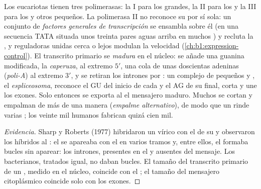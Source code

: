 \begin{proposition}\label{prop:b1:gene-expression:processing}
Los eucariotas tienen tres polimerasas: la I para los 
grandes, la II para los  y la III para los  y otros  pequeños. La polimerasa II no reconoce su 
por sí sola: un conjunto de \emph{factores generales de transcripción} se
ensambla sobre él (en una secuencia TATA situada unos treinta pares aguas
arriba en muchos ) y recluta la , y  reguladoras unidas
cerca o lejos modulan la velocidad (\cref{ch:b1:expression-control}). El
transcrito primario se \emph{madura} en el núcleo: se añade una guanina
modificada, la \emph{caperuza}, al extremo $5'$, una cola de unas doscientas
adeninas (\emph{poli-A}) al extremo $3'$, y se retiran los intrones por
\emph{}: un complejo de  pequeños y , el
\emph{espliceosoma}, reconoce el GU del inicio de cada  y el AG de su
final, corta y une los exones. Solo entonces se exporta al  el
mensajero maduro. Muchos  se cortan y empalman de más de una manera
(\emph{empalme alternativo}), de modo que un  rinde varias ; los
veinte mil  humanos fabrican quizá cien mil.
\end{proposition}
\begin{proof}[Evidencia]
Sharp y Roberts (1977) hibridaron un  vírico con el  de su
 y observaron los híbridos al : el  se apareaba
con el  en varios tramos y, entre ellos, el  formaba bucles sin
aparear: los intrones, presentes en el  y ausentes del mensaje. Los 
bacterianos, tratados igual, no daban bucles. El tamaño del transcrito
primario de un , medido en el núcleo, coincide con el ; el tamaño del
mensajero citoplásmico coincide solo con los exones.
\end{proof}


